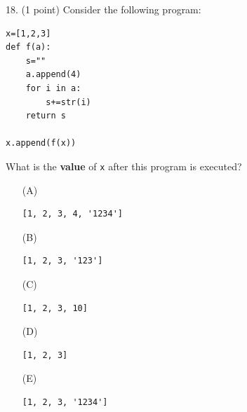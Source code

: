 \documentclass{article}
\begin{document}
\noindent
\begin{minipage}{\textwidth}
18. (1 point)
Consider the following program:
\begin{verbatim}
x=[1,2,3]
def f(a):
    s=""
    a.append(4)
    for i in a:
        s+=str(i)
    return s

x.append(f(x))
\end{verbatim}
What is the \textbf{value} of \texttt{x} after this program is executed?

\begin{enumerate}
\item[(A)]
\begin{verbatim}[1, 2, 3, 4, '1234']\end{verbatim}

\item[(B)]
\begin{verbatim}[1, 2, 3, '123']\end{verbatim}

\item[(C)]
\begin{verbatim}[1, 2, 3, 10]\end{verbatim}

\item[(D)]
\begin{verbatim}[1, 2, 3]\end{verbatim}

\item[(E)]
\begin{verbatim}[1, 2, 3, '1234']\end{verbatim}

\end{enumerate}
\end{minipage}
\vspace{2em}
\filbreak\vfil{}\vfilneg
\end{document}
